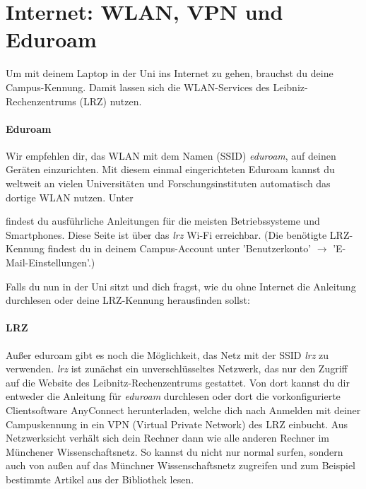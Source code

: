 \section{Internet: WLAN, VPN und Eduroam}

Um mit deinem Laptop in der Uni ins Internet zu gehen, brauchst du
deine Campus-Kennung. Damit lassen sich die WLAN-Services des
Leibniz-Rechen\-zentrums (LRZ) nutzen.

\paragraph{Eduroam}
Wir empfehlen dir, das WLAN mit dem Namen (SSID) \emph{eduroam}, auf deinen Geräten einzurichten. Mit diesem einmal eingerichteten Eduroam kannst du weltweit an vielen Universitäten und Forschungsinstituten automatisch das dortige WLAN nutzen. Unter \begin{urlList}
\end{urlList} findest du ausführliche Anleitungen für die meisten Betriebssysteme und Smartphones.
Diese Seite ist über das \emph{lrz} Wi-Fi erreichbar.
(Die benötigte LRZ-Kennung findest du in deinem Campus-Account unter 'Benutzerkonto' $\rightarrow$ 'E-Mail-Einstellungen'.)


Falls du nun in der Uni sitzt und dich fragst, wie du ohne Internet
die Anleitung durchlesen oder deine LRZ-Kennung herausfinden sollst:

\paragraph{LRZ}

Außer eduroam gibt es noch die Möglichkeit, das Netz mit der SSID
\emph{lrz} zu verwenden. \emph{lrz} ist zunächst ein unverschlüsseltes
Netzwerk, das nur den Zugriff auf die Website des
Leibnitz-Rechenzentrums gestattet. Von dort kannst du dir entweder die 
Anleitung für \emph{eduroam} durchlesen oder dort die
vorkonfigurierte Clientsoftware AnyConnect herunterladen, welche dich
nach Anmelden mit deiner Campuskennung in ein VPN (Virtual Private
Network) des LRZ einbucht. Aus Netzwerksicht verhält sich dein Rechner
dann wie alle anderen Rechner im Münchener Wissenschaftsnetz. So
kannst du nicht nur normal surfen, sondern auch von außen auf das
Münchner Wissenschaftsnetz zugreifen und zum Beispiel bestimmte
Artikel aus der Bibliothek lesen.

